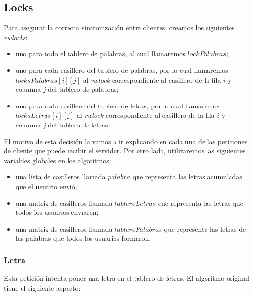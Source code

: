 \subsection{Locks}

Para asegurar la correcta sincronización entre clientes, creamos los siguientes \emph{rwlocks}:

\begin{itemize}

    \item uno para todo el tablero de palabras, al cual llamaremos $lockPalabras$;
    
    \item uno para cada casillero del tablero de palabras, por lo cual llamaremos $locksPalabras[i][j]$ al \emph{rwlock} correspondiente al casillero de la fila $i$ y columna $j$ del tablero de palabras;
    
    \item uno para cada casillero del tablero de letras, por lo cual llamaremos $locksLetras[i][j]$ al \emph{rwlock} correspondiente al casillero de la fila $i$ y columna $j$ del tablero de letras.

\end{itemize}

El motivo de esta decisión la vamos a ir explicando en cada una de las peticiones de cliente que puede recibir el servidor. Por otro lado, utilizaremos las siguientes variables globales en los algoritmos:

\begin{itemize}

    \item una lista de casilleros llamada $palabra$ que representa las letras acumuladas que el usuario envió;
    
    \item una matriz de casilleros llamada $tableroLetras$ que representa las letras que todos los usuarios enviaron;
    
    \item una matriz de casilleros llamada $tableroPalabras$ que representa las letras de las palabras que todos los usuarios formaron.

\end{itemize}

\subsubsection{Letra}

Esta petición intenta poner una letra en el tablero de letras. El algoritmo original tiene el siguiente aspecto:

